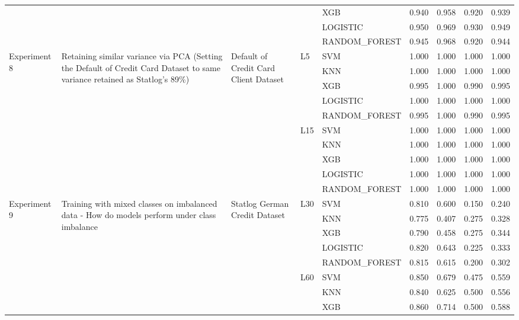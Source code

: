 \begin{table}
\begin{tabular}{lllllrrrr}
 &  &  &  & XGB & 0.940 & 0.958 & 0.920 & 0.939 \\
 &  &  &  & LOGISTIC & 0.950 & 0.969 & 0.930 & 0.949 \\
 &  &  &  & RANDOM\_FOREST & 0.945 & 0.968 & 0.920 & 0.944 \\
\cline{1-9} \cline{2-9} \cline{3-9} \cline{4-9}
\multirow[t]{10}{*}{Experiment 8} & \multirow[t]{10}{*}{Retaining similar variance via PCA (Setting the Default of Credit Card Dataset to same variance retained as Statlog's 89\%)} & \multirow[t]{10}{*}{Default of Credit Card Client Dataset} & \multirow[t]{5}{*}{L5} & SVM & 1.000 & 1.000 & 1.000 & 1.000 \\
 &  &  &  & KNN & 1.000 & 1.000 & 1.000 & 1.000 \\
 &  &  &  & XGB & 0.995 & 1.000 & 0.990 & 0.995 \\
 &  &  &  & LOGISTIC & 1.000 & 1.000 & 1.000 & 1.000 \\
 &  &  &  & RANDOM\_FOREST & 0.995 & 1.000 & 0.990 & 0.995 \\
\cline{4-9}
 &  &  & \multirow[t]{5}{*}{L15} & SVM & 1.000 & 1.000 & 1.000 & 1.000 \\
 &  &  &  & KNN & 1.000 & 1.000 & 1.000 & 1.000 \\
 &  &  &  & XGB & 1.000 & 1.000 & 1.000 & 1.000 \\
 &  &  &  & LOGISTIC & 1.000 & 1.000 & 1.000 & 1.000 \\
 &  &  &  & RANDOM\_FOREST & 1.000 & 1.000 & 1.000 & 1.000 \\
\cline{1-9} \cline{2-9} \cline{3-9} \cline{4-9}
\multirow[t]{20}{*}{Experiment 9} & \multirow[t]{20}{*}{Training with mixed classes on imbalanced data - How do models perform under class imbalance} & \multirow[t]{10}{*}{Statlog German Credit Dataset} & \multirow[t]{5}{*}{L30} & SVM & 0.810 & 0.600 & 0.150 & 0.240 \\
 &  &  &  & KNN & 0.775 & 0.407 & 0.275 & 0.328 \\
 &  &  &  & XGB & 0.790 & 0.458 & 0.275 & 0.344 \\
 &  &  &  & LOGISTIC & 0.820 & 0.643 & 0.225 & 0.333 \\
 &  &  &  & RANDOM\_FOREST & 0.815 & 0.615 & 0.200 & 0.302 \\
\cline{4-9}
 &  &  & \multirow[t]{5}{*}{L60} & SVM & 0.850 & 0.679 & 0.475 & 0.559 \\
 &  &  &  & KNN & 0.840 & 0.625 & 0.500 & 0.556 \\
 &  &  &  & XGB & 0.860 & 0.714 & 0.500 & 0.588 \\

\end{tabular}
\end{table}
